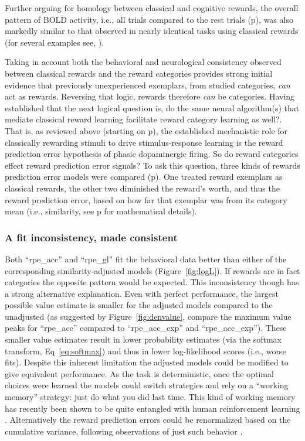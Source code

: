 Further arguing for homology between classical and cognitive rewards, the overall pattern of BOLD activity, i.e., all trials compared to the rest trials (p\pageref{sub:blob}), was also markedly similar to that observed in nearly identical tasks using classical rewards (for several examples see, ).

Taking in account both the behavioral and neurological consistency observed between classical rewards and the reward categories provides strong initial evidence that previously unexperienced exemplars, from studied categories, \emph{can} act as rewards.  Reversing that logic, rewards therefore \emph{can} be categories.  Having established that the next logical question is, do the same neural algorithm(s) that mediate classical reward learning facilitate reward category learning as well?.  That is, as reviewed above (starting on p\pageref{subsub:expectations}), the established mechanistic role for classically rewarding stimuli to drive stimulus-response learning is the reward prediction error hypothesis of phasic dopaminergic firing.  So do reward categories effect reward prediction error signals?  To ask this question, three kinds of rewards prediction error models were compared (p\pageref{sub:threemodels}).  One treated reward exemplars as classical rewards, the other two diminished the reward's worth, and thus the reward prediction error, based on how far that exemplar was from its category mean (i.e., similarity, see p\pageref{subsub:incantations} for mathematical details).

\subsubsection{A fit inconsistency, made consistent}
\label{subsub:inconsistency}
Both ``rpe\_acc'' and ``rpe\_gl'' fit the behavioral data better than either of the corresponding similarity-adjusted models (Figure~\ref{fig:logL}).  If rewards are in fact categories the opposite pattern would be expected.  This inconsistency though has a strong alternative explanation.  Even with perfect performance, the largest possible value estimate is smaller for the adjusted models compared to the unadjusted (as suggested by Figure~\ref{fig:denvalue}, compare the maximum value peaks for ``rpe\_acc'' compared to ``rpe\_acc\_exp'' and ``rpe\_acc\_exp'').  These smaller value estimates result in lower probability estimates (via the softmax transform, Eq~\ref{eq:softmax}) and thus in lower log-likelihood scores (i.e., worse fits).  Despite this inherent limitation the adjusted models could be modified to give equivalent performance.  As the task is deterministic, once the optimal choices were learned the models could switch strategies and rely on a ``working memory'' strategy: just do what you did last time.  This kind of working memory has recently been shown to be quite entangled with human reinforcement learning \cite{Collins:2012p9779}.  Alternatively the reward prediction errors could be renormalized based on the cumulative variance, following observations of just such behavior \cite{Tobler:2005p6373}.

